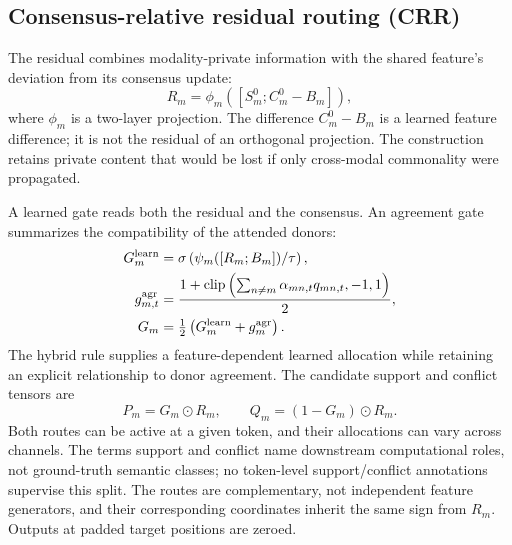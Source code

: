 \documentclass[review,12pt]{elsarticle}
\newcommand{\clip}{\operatorname{clip}}
\begin{document}
\subsection{Consensus-relative residual routing (CRR)}
The residual combines modality-private information with the shared feature's deviation from its consensus update:
\begin{equation}
R_m=\phi_m([S_m^0;C_m^0-B_m]),
\label{eq:residual}
\end{equation}
where $\phi_m$ is a two-layer projection. The difference $C_m^0-B_m$ is a learned feature difference; it is not the residual of an orthogonal projection. The construction retains private content that would be lost if only cross-modal commonality were propagated.

A learned gate reads both the residual and the consensus. An agreement gate summarizes the compatibility of the attended donors:
\begin{align}
G_m^{\rm learn}&=\sigma\left(\psi_m([R_m;B_m])/\tau\right),\\
g_{m,t}^{\rm agr}&=\frac{1+\clip\left(\sum_{n\ne m}\alpha_{mn,t}q_{mn,t},-1,1\right)}{2},\\
G_m&=\tfrac12\left(G_m^{\rm learn}+g_m^{\rm agr}\right).
\label{eq:gate}
\end{align}
The hybrid rule supplies a feature-dependent learned allocation while retaining an explicit relationship to donor agreement. The candidate support and conflict tensors are
\begin{equation}
P_m=G_m\odot R_m,\qquad Q_m=(1-G_m)\odot R_m.
\label{eq:partition}
\end{equation}
Both routes can be active at a given token, and their allocations can vary across channels. The terms support and conflict name downstream computational roles, not ground-truth semantic classes; no token-level support/conflict annotations supervise this split. The routes are complementary, not independent feature generators, and their corresponding coordinates inherit the same sign from $R_m$. Outputs at padded target positions are zeroed.
\end{document}
